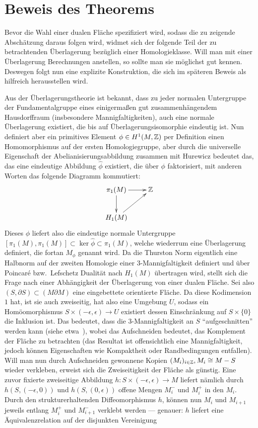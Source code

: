 \section{Beweis des Theorems}

Bevor die Wahl einer dualen Fläche spezifiziert wird, sodass die zu zeigende Abschätzung daraus folgen wird, widmet sich der folgende Teil der zu betrachtenden Überlagerung bezüglich einer Homologieklasse. Will man mit einer Überlagerung Berechnungen anstellen, so sollte man sie möglichst gut kennen. Deswegen folgt nun eine explizite Konstruktion, die sich im späteren Beweis als hilfreich herausstellen wird.

\begin{bem}
	\label{constr:cut}
	Aus der Überlagerungstheorie ist bekannt, dass zu jeder normalen Untergruppe der Fundamentalgruppe eines einigermaßen gut zusammenhängendem Hausdorffraum (insbesondere Mannigfaltigkeiten), auch eine normale Überlagerung existiert, die bis auf Überlagerungsisomorphie eindeutig ist. Nun definiert aber ein primitives Element $\phi\in H^1(M,\mathbb{Z})$ per Definition einen Homomorphismus auf der ersten Homologiegruppe, aber durch die universelle Eigenschaft der Abelianisierungsabbildung zusammen mit Hurewicz bedeutet das, das eine eindeutige Abbildung $\hat \phi$ existiert, die über $\phi$ faktorisiert, mit anderen Worten das folgende Diagramm kommutiert:
	\[
		\begin{xy}
			\xymatrix{\pi_1(M)\ar[r] \ar[d] & \ZZ \\
						H_1(M)\ar[ru]}
		\end{xy}
	\]
	Dieses $\phi$ liefert also die eindeutige normale Untergruppe $[\pi_1(M),\pi_1(M)]\subset\ker\hat\phi \subset \pi_1(M)$, welche wiederrum eine Überlagerung definiert, die fortan $M_\phi$ genannt wird. Da die Thurston Norm eigentlich eine Halbnorm auf der zweiten Homologie einer 3-Mannigfaltigkeit definiert und über Poincaré bzw.~Lefschetz Dualität nach $H_1(M)$ übertragen wird, stellt sich die Frage nach einer Abhängigkeit der Überlagerung von einer dualen Fläche. Sei also $(S,\partial S) \subset (M\partial M)$ eine eingebettete orientierte Fläche. Da diese Kodimension $1$ hat, ist sie auch zweiseitig, hat also eine Umgebung $U$, sodass ein Homöomorphismus $S\times (-\epsilon,\epsilon) \to U$ existiert dessen Einschränkung auf $S\times \{0\}$ die Inklusion ist. Das bedeutet, dass die 3-Mannigfaltigkeit an $S$ "`aufgeschnitten"' werden kann (siehe etwa~\cite{Burde2003}), wobei das Aufschneiden bedeutet, das Komplement der Fläche zu betrachten (das Resultat ist offensichtlich eine Mannigfaltigkeit, jedoch können Eigenschaften wie Kompaktheit oder Randbedingungen entfallen). Will man nun durch Aufschneiden gewonnene Kopien $(M_i)_{i\in \mathbb{Z}}, M_i \cong M-S$ wieder verkleben, erweist sich die Zweiseitigkeit der Fläche als günstig. Eine zuvor fixierte zweiseitige Abbildung $h: S\times (-\epsilon,\epsilon) \to M$ liefert nämlich durch $h(S,(-\epsilon,0))$ und $h(S,(0,\epsilon))$ offene Mengen $M_i^-$ und $M_i^+$ in den $M_i$. Durch den strukturerhaltenden Diffeomorphismus $h$, können nun $M_i$ und $M_{i+1}$ jeweils entlang $M_i^+$ und $M_{i+1}^-$ verklebt werden --- genauer: $h$ liefert eine Äquivalenzrelation auf der disjunkten Vereinigung 

\end{bem}
